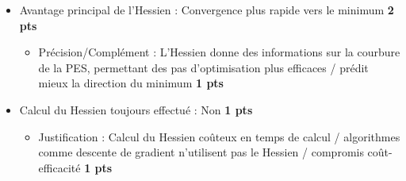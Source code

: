 \documentclass[a4paper,answers]{exam}
\newcommand{\pts}[1]{\textbf{#1 pts}}
\begin{document}
\begin{questions}

    \begin{solution}
    \begin{itemize}
        \item Avantage principal de l'Hessien : Convergence plus rapide vers le minimum \hfill  \pts{2}
        \begin{itemize}
            \item Précision/Complément : L'Hessien donne des informations sur la courbure de la PES, permettant des pas d'optimisation plus efficaces / prédit mieux la direction du minimum \hfill  \pts{1}
        \end{itemize}

        \item Calcul du Hessien toujours effectué : Non \hfill  \pts{1}
        \begin{itemize}
            \item Justification : Calcul du Hessien coûteux en temps de calcul / algorithmes comme descente de gradient n'utilisent pas le Hessien / compromis coût-efficacité \hfill  \pts{1}
        \end{itemize}
    \end{itemize}
    \end{solution}


\end{questions}
\end{document}
